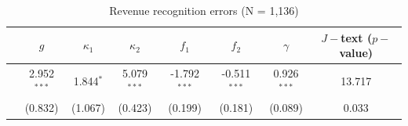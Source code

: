 \begin{table}[ht]
\centering
\begin{tabular}{cccccccc}
  \toprule
 & $g$ & $\kappa_1$ & $\kappa_2$ & $f_1$ & $f_2$ & $\gamma$ & $J-$text ($p-$value) \\ 
  \midrule
 & 2.952$^{***}$ & 1.844$^{*}$ & 5.079$^{***}$ & -1.792$^{***}$ & -0.511$^{***}$ & 0.926$^{***}$ & 13.717 \\ 
   & (0.832) & (1.067) & (0.423) & (0.199) & (0.181) & (0.089) & 0.033 \\ 
   \bottomrule
\end{tabular}
\caption{Revenue recognition errors (N = 1,136)} 
\end{table}
